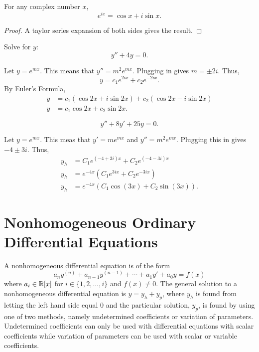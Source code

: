 \begin{theorem}
    For any complex number $x$, $$e^{ix} = \cos x + i \sin x.$$
\end{theorem}
\begin{proof}
    A taylor series expansion of both sides gives the result.
\end{proof}
\begin{example}
   Solve for $y$: $$ y''+4y = 0.$$
\end{example}
\begin{soln}
    Let $y=e^{mx}$. This means that $y'' = m^2e^{mx}$. Plugging in gives
    $m= \pm 2i$. Thus, $$y = c_1e^{2ix} + c_2e^{-2ix}.$$ By Euler's Formula,
    \begin{align*}
        y &= c_1(\cos 2x + i\sin 2x) + c_2(\cos 2x  -i\sin  2x) \\
        y &= c_1\cos 2x + c_2 \sin 2x.
    \end{align*}
\end{soln}
\begin{example}
$$y''+8y'+25y = 0.$$
\end{example}
\begin{soln}
    Let $y=e^{mx}$. This meas that $y' = me^{mx}$ and $y'' = m^2e^{mx}$.
    Plugging this in gives $-4\pm 3i$. Thus, 
    \begin{align*}
        y_h &= C_1e^{(-4+3i)x} + C_2e^{(-4-3i)x} \\
        y_h &= e^{-4x}\left(C_1e^{3ix} + C_2e^{-3ix} \right) \\
        y_h &= e^{-4x}\left(C_1 \cos(3x) + C_2 \sin (3x) \right).
    \end{align*}
\end{soln}

\section{Nonhomogeneous Ordinary Differential Equations}
A \alert{nonhomogeneous} differential equation is of the form
$$a_ny^{(n)} +a_{n-1}y^{(n-1)}+\cdots+a_1y'+a_0y = f(x)$$
where $a_i \in \mathbb R[x]$ for $i \in \{1,2,\dots,i\}$ and $f(x) \neq 0$. 
The general solution to a nonhomogeneous
differential equation is $y = y_h+y_p$, where $y_h$ is found from letting
the left hand side equal $0$ and the particular solution, $y_p$, is found
by using one of two methods, namely \alert{undetermined coefficients} or
\alert{variation of parameters}. Undetermined coefficients can only be used
with differential equations with scalar coefficients while variation of parameters
can be used with scalar or variable coefficients.

